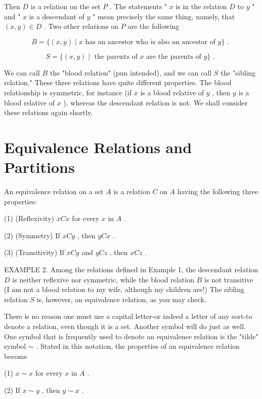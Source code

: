 Then \(D\) is a relation on the set \(P\) . The statements " \(x\) is in the relation \(D\) to \(y\) " and " \(x\) is a descendant of \(y\) " mean precisely the same thing, namely, that \(\left( {x,y}\right)  \in  D\) . Two other relations on \(P\) are the following

\[
B = \{ \left( {x,y}\right)  \mid  x\text{ has an ancestor who is also an ancestor of }y\} \text{ . }
\]

\[
S = \{ \left( {x,y}\right)  \mid  \text{ the parents of }x\text{ are the parents of }y\} \text{ . }
\]

We can call \(B\) the "blood relation" (pun intended), and we can call \(S\) the "sibling relation." These three relations have quite different properties. The blood relationship is symmetric, for instance (if \(x\) is a blood relative of \(y\) , then \(y\) is a blood relative of \(x\) ), whereas the descendant relation is not. We shall consider these relations again shortly.

\section*{Equivalence Relations and Partitions}

An equivalence relation on a set \(A\) is a relation \(C\) on \(A\) having the following three properties:

(1) (Reflexivity) \({xCx}\) for every \(x\) in \(A\) .

(2) (Symmetry) If \({xCy}\) , then \({yCx}\) .

(3) (Transitivity) If \({xCy}\) and \({yCz}\) , then \({xCz}\) .

EXAMPLE 2. Among the relations defined in Example 1, the descendant relation \(D\) is neither reflexive nor symmetric, while the blood relation \(B\) is not transitive (I am not a blood relation to my wife, although my children are!) The sibling relation \(S\) is, however, an equivalence relation, as you may check.

There is no reason one must use a capital letter-or indeed a letter of any sort-to denote a relation, even though it is a set. Another symbol will do just as well. One symbol that is frequently used to denote an equivalence relation is the "tilde" symbol \(\sim\) . Stated in this notation, the properties of an equivalence relation become

(1) \(x \sim  x\) for every \(x\) in \(A\) .

(2) If \(x \sim  y\) , then \(y \sim  x\) .


